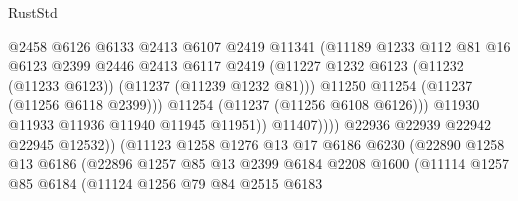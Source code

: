 \begin{lexlean}{RustStd}
\begin{coremodule}
                                    @2458
                                    @6126
                                    @6133
                                    @2413
                                    @6107
                                    @2419
                                    @11341
                                    (@11189
                                      @1233
                                      @112
                                      @81
                                      @16
                                      @6123
                                      @2399
                                      @2446
                                      @2413
                                      @6117
                                      @2419
                                      (@11227
                                        @1232
                                        @6123
                                        (@11232 (@11233 @6123))
                                        (@11237 (@11239 @1232 @81)))
                                      @11250
                                      @11254
                                      (@11237 (@11256 @6118 @2399)))
                                    @11254
                                    (@11237 (@11256 @6108 @6126)))
                                  @11930
                                  @11933
                                  @11936
                                  @11940
                                  @11945
                                  @11951))
                              @11407))))
                      @22936
                      @22939
                      @22942
                      @22945
                      @12532))
                  (@11123
                    @1258
                    @1276
                    @13
                    @17
                    @6186
                    @6230
                    (@22890
                      @1258
                      @13
                      @6186
                      (@22896
                        @1257
                        @85
                        @13
                        @2399
                        @6184
                        @2208
                        @1600
                        (@11114
                          @1257
                          @85
                          @6184
                          (@11124
                            @1256
                            @79
                            @84
                            @2515
                            @6183

\end{coremodule}
\end{lexlean}
